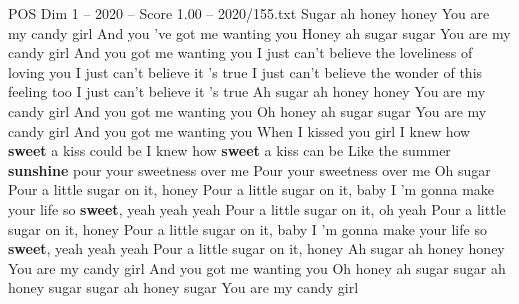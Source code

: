 \begin{textsample}{POS Dim 1 – 2020 – Score 1.00 – 2020/155.txt}  \label{ex:f1_pos_010}
Sugar ah honey honey You are my candy girl And you 've got me wanting you Honey ah sugar sugar You are my candy girl And you got me wanting you I just can't believe the loveliness of loving you I just can't believe it 's true I just can't believe the wonder of this feeling too I just can't believe it 's true Ah sugar ah honey honey You are my candy girl And you got me wanting you Oh honey ah sugar sugar You are my candy girl And you got me wanting you When I kissed you girl I knew how \textbf{sweet} a kiss could be I knew how \textbf{sweet} a kiss can be Like the summer \textbf{sunshine} pour your sweetness over me Pour your sweetness over me Oh sugar Pour a little sugar on it, honey Pour a little sugar on it, baby I 'm gonna make your life so \textbf{sweet}, yeah yeah yeah Pour a little sugar on it, oh yeah Pour a little sugar on it, honey Pour a little sugar on it, baby I 'm gonna make your life so \textbf{sweet}, yeah yeah yeah Pour a little sugar on it, honey Ah sugar ah honey honey You are my candy girl And you got me wanting you Oh honey ah sugar sugar ah honey sugar sugar ah honey sugar You are my candy girl

\end{textsample}
